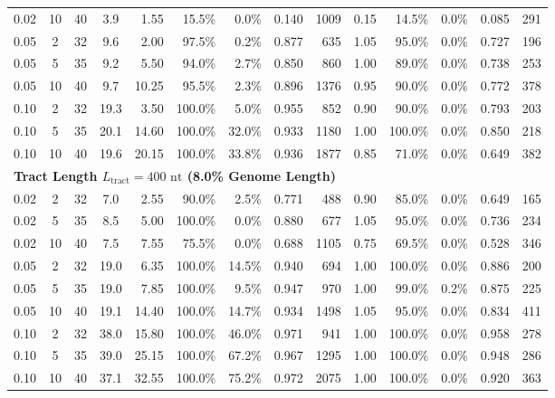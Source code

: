\begin{table}[t!]
\begin{tabular*}{\textwidth}{@{\extracolsep{\fill}} ccc c rrrrr rrrrr @{}}
0.02 & 10 & 40 &  3.9 &  1.55 &  15.5\% &   0.0\% & 0.140 &  1009 &  0.15 &  14.5\% &   0.0\% & 0.085 &   291 \\
0.05 &  2 & 32 &  9.6 &  2.00 &  97.5\% &   0.2\% & 0.877 &   635 &  1.05 &  95.0\% &   0.0\% & 0.727 &   196 \\
0.05 &  5 & 35 &  9.2 &  5.50 &  94.0\% &   2.7\% & 0.850 &   860 &  1.00 &  89.0\% &   0.0\% & 0.738 &   253 \\
0.05 & 10 & 40 &  9.7 & 10.25 &  95.5\% &   2.3\% & 0.896 &  1376 &  0.95 &  90.0\% &   0.0\% & 0.772 &   378 \\
0.10 &  2 & 32 & 19.3 &  3.50 & 100.0\% &   5.0\% & 0.955 &   852 &  0.90 &  90.0\% &   0.0\% & 0.793 &   203 \\
0.10 &  5 & 35 & 20.1 & 14.60 & 100.0\% &  32.0\% & 0.933 &  1180 &  1.00 & 100.0\% &   0.0\% & 0.850 &   218 \\
0.10 & 10 & 40 & 19.6 & 20.15 & 100.0\% &  33.8\% & 0.936 &  1877 &  0.85 &  71.0\% &   0.0\% & 0.649 &   382 \\
\midrule
\multicolumn{14}{l}{\textbf{Tract Length $L_{\text{tract}} = 400\text{ nt}$ (8.0\% Genome Length)}} \\
0.02 &  2 & 32 &  7.0 &  2.55 &  90.0\% &   2.5\% & 0.771 &   488 &  0.90 &  85.0\% &   0.0\% & 0.649 &   165 \\
0.02 &  5 & 35 &  8.5 &  5.00 & 100.0\% &   0.0\% & 0.880 &   677 &  1.05 &  95.0\% &   0.0\% & 0.736 &   234 \\
0.02 & 10 & 40 &  7.5 &  7.55 &  75.5\% &   0.0\% & 0.688 &  1105 &  0.75 &  69.5\% &   0.0\% & 0.528 &   346 \\
0.05 &  2 & 32 & 19.0 &  6.35 & 100.0\% &  14.5\% & 0.940 &   694 &  1.00 & 100.0\% &   0.0\% & 0.886 &   200 \\
0.05 &  5 & 35 & 19.0 &  7.85 & 100.0\% &   9.5\% & 0.947 &   970 &  1.00 &  99.0\% &   0.2\% & 0.875 &   225 \\
0.05 & 10 & 40 & 19.1 & 14.40 & 100.0\% &  14.7\% & 0.934 &  1498 &  1.05 &  95.0\% &   0.0\% & 0.834 &   411 \\
0.10 &  2 & 32 & 38.0 & 15.80 & 100.0\% &  46.0\% & 0.971 &   941 &  1.00 & 100.0\% &   0.0\% & 0.958 &   278 \\
0.10 &  5 & 35 & 39.0 & 25.15 & 100.0\% &  67.2\% & 0.967 &  1295 &  1.00 & 100.0\% &   0.0\% & 0.948 &   286 \\
0.10 & 10 & 40 & 37.1 & 32.55 & 100.0\% &  75.2\% & 0.972 &  2075 &  1.00 & 100.0\% &   0.0\% & 0.920 &   363 \\

\end{tabular*}
\end{table}
